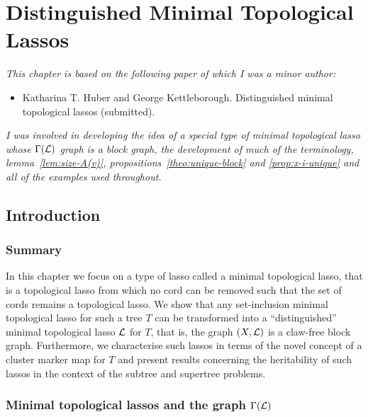 \chapter{Distinguished Minimal Topological Lassos}
\label{cha:dist-minim-topl}

\textit{This chapter is based on the following paper of which I was a minor
  author:}

\vspace{0.5em}

\noindent

\begin{itemize}
\item Katharina T. Huber and George Kettleborough. Distinguished minimal
  topological lassos (submitted).
\end{itemize}

\vspace{1em}

\textit{I was involved in developing the idea of a special type of minimal
  topological lasso whose $\Gamma({\mathcal L})$ graph is a block graph, the
  development of much of the terminology, lemma~\ref{lem:size-A(v)},
  propositions~\ref{theo:unique-block} and \ref{prop:x-i-unique} and all of
  the examples used throughout.  }
\newpage

\section{Introduction}

\subsection{Summary}

In this chapter we focus on a type of lasso called a minimal topological
lasso, that is a topological lasso from which no cord can be removed such that
the set of cords remains a topological lasso.  We show that any set-inclusion
minimal topological lasso for such a tree $T$ can be transformed into a
``distinguished'' minimal topological lasso ${\mathcal L}$ for $T$, that is, the graph
$(X,{\mathcal L})$ is a claw-free block graph. Furthermore, we characterise such lassos
in terms of the novel concept of a cluster marker map for $T$ and present
results concerning the heritability of such lassos in the context of the
subtree and supertree problems.

\subsection{Minimal topological lassos and the graph $\Gamma({\mathcal L})$}
\label{sec:terminology}

